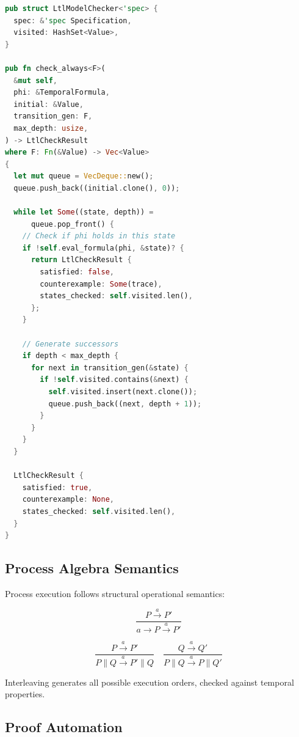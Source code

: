 \documentclass[conference]{IEEEtran}
\begin{document}
\begin{lstlisting}[language=Rust, caption={LTL model checker core}]
pub struct LtlModelChecker<'spec> {
  spec: &'spec Specification,
  visited: HashSet<Value>,
}

pub fn check_always<F>(
  &mut self,
  phi: &TemporalFormula,
  initial: &Value,
  transition_gen: F,
  max_depth: usize,
) -> LtlCheckResult
where F: Fn(&Value) -> Vec<Value>
{
  let mut queue = VecDeque::new();
  queue.push_back((initial.clone(), 0));

  while let Some((state, depth)) =
      queue.pop_front() {
    // Check if phi holds in this state
    if !self.eval_formula(phi, &state)? {
      return LtlCheckResult {
        satisfied: false,
        counterexample: Some(trace),
        states_checked: self.visited.len(),
      };
    }

    // Generate successors
    if depth < max_depth {
      for next in transition_gen(&state) {
        if !self.visited.contains(&next) {
          self.visited.insert(next.clone());
          queue.push_back((next, depth + 1));
        }
      }
    }
  }

  LtlCheckResult {
    satisfied: true,
    counterexample: None,
    states_checked: self.visited.len(),
  }
}
\end{lstlisting}

\subsection{Process Algebra Semantics}

Process execution follows structural operational semantics:

\begin{equation}
\frac{P \xrightarrow{a} P'}{a \to P \xrightarrow{a} P'}
\end{equation}

\begin{equation}
\frac{P \xrightarrow{a} P'}{P \parallel Q \xrightarrow{a} P' \parallel Q} \quad
\frac{Q \xrightarrow{a} Q'}{P \parallel Q \xrightarrow{a} P \parallel Q'}
\end{equation}

Interleaving generates all possible execution orders, checked against temporal properties.

\subsection{Proof Automation}
\end{document}
